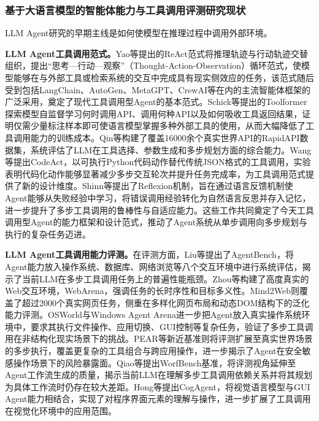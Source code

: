 %

\subsubsection{基于大语言模型的智能体能力与工具调用评测研究现状}

LLM Agent研究的早期主线是如何使模型在推理过程中调用外部环境。

\textbf{LLM Agent工具调用范式。}Yao等\cite{yao2023react}提出的ReAct范式将推理轨迹与行动轨迹交替组织，提出“思考—行动—观察”（Thought-Action-Observation）循环范式，使模型能够在与外部工具或检索系统的交互中完成具有现实侧效应的任务，该范式随后受到包括LangChain、AutoGen、MetaGPT、CrewAI等在内的主流智能体框架的广泛采用，奠定了现代工具调用型Agent的基本范式。Schick等\cite{schick2023toolformer}提出的Toolformer探索模型自监督学习何时调用API、调用何种API以及如何吸收工具返回结果，证明仅需少量标注样本即可使语言模型掌握多种外部工具的使用，从而大幅降低了工具调用能力的训练成本。Qin等\cite{qin2024toolllm}构建了覆盖16000余个真实世界API的RapidAPI数据集，系统评估了LLM在工具选择、参数生成和多步规划方面的综合能力。Wang等\cite{wang2024codeact}提出CodeAct，以可执行Python代码动作替代传统JSON格式的工具调用，实验表明代码化动作能够显著减少多步交互轮次并提升任务完成率，为工具调用范式提供了新的设计维度。Shinn等\cite{shinn2023reflexion}提出了Reflexion机制，旨在通过语言反馈机制使Agent能够从失败经验中学习，将错误调用经验转化为自然语言反思并存入记忆，进一步提升了多步工具调用的鲁棒性与自适应能力。这些工作共同奠定了今天工具调用型Agent的能力框架和设计范式，推动了Agent系统从单步调用向多步规划与执行的复杂任务迈进。

\textbf{LLM Agent工具调用能力评测。}在评测方面，Liu等\cite{liu2024agentbench}提出了AgentBench，将Agent能力放入操作系统、数据库、网络浏览等八个交互环境中进行系统评估，揭示了当前LLM在多步工具调用任务上的普遍性能瓶颈。Zhou等\cite{zhou2023webarena}构建了高度真实的Web交互环境，WebArena，强调任务的长时序性和目标多义性。Mind2Web\cite{deng2023mind2web}则覆盖了超过2000个真实网页任务，侧重在多样化网页布局和动态DOM结构下的泛化能力评测。OSWorld\cite{xie2024osworld}与Windows Agent Arena\cite{bonatti2025windows}进一步把Agent放入真实操作系统环境中，要求其执行文件操作、应用切换、GUI控制等复杂任务，验证了多步工具调用在非结构化现实场景下的挑战。PEAR\cite{dong2026pear}等新近基准则将评测扩展至真实世界场景的多步执行，覆盖更复杂的工具组合与跨应用操作，进一步揭示了Agent在安全敏感操作场景下的风险暴露面。Qiao等\cite{qiao2025worfbench}提出WorfBench基准，将评测视角延伸至Agent工作流生成的质量，揭示当前LLM在理解多步工具调用依赖关系并将其规划为具体工作流时仍存在较大差距。Hong等\cite{hong2024cogagent}提出CogAgent，将视觉语言模型与GUI Agent能力相结合，实现了对程序界面元素的理解与操作，进一步扩展了工具调用在视觉化环境中的应用范围。

